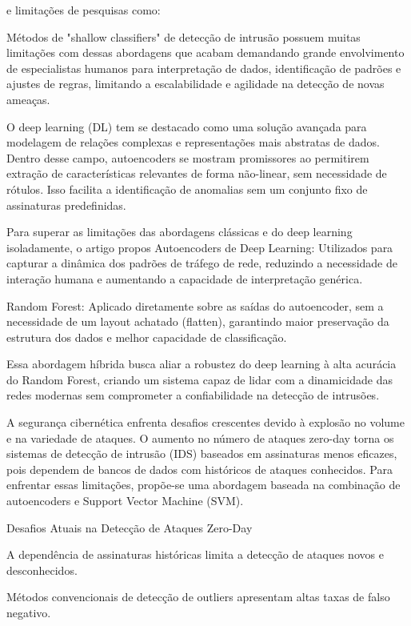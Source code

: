 \documentclass[conference]{IEEEtran}
\begin{document}
    e limitações de pesquisas como: 
            
    Métodos de "shallow classifiers" de detecção de intrusão possuem muitas limitações com dessas abordagens que acabam demandando grande envolvimento de especialistas humanos para interpretação de dados, identificação de padrões e ajustes de regras, limitando a escalabilidade e agilidade na detecção de novas ameaças.
        
    O deep learning (DL) tem se destacado como uma solução avançada para modelagem de relações complexas e representações mais abstratas de dados. Dentro desse campo, autoencoders se mostram promissores ao permitirem extração de características relevantes de forma não-linear, sem necessidade de rótulos. Isso facilita a identificação de anomalias sem um conjunto fixo de assinaturas predefinidas.
        
    Para superar as limitações das abordagens clássicas e do deep learning isoladamente, o artigo propos 
    Autoencoders de Deep Learning: Utilizados para capturar a dinâmica dos padrões de tráfego de rede, reduzindo a necessidade de interação humana e aumentando a capacidade de interpretação genérica.
    
    Random Forest: Aplicado diretamente sobre as saídas do autoencoder, sem a necessidade de um layout achatado (flatten), garantindo maior preservação da estrutura dos dados e melhor capacidade de classificação.
    
    Essa abordagem híbrida busca aliar a robustez do deep learning à alta acurácia do Random Forest, criando um sistema capaz de lidar com a dinamicidade das redes modernas sem comprometer a confiabilidade na detecção de intrusões.

    \cite{4} A segurança cibernética enfrenta desafios crescentes devido à explosão no volume e na variedade de ataques. O aumento no número de ataques zero-day torna os sistemas de detecção de intrusão (IDS) baseados em assinaturas menos eficazes, pois dependem de bancos de dados com históricos de ataques conhecidos. Para enfrentar essas limitações, propõe-se uma abordagem baseada na combinação de autoencoders e Support Vector Machine (SVM).

Desafios Atuais na Detecção de Ataques Zero-Day

A dependência de assinaturas históricas limita a detecção de ataques novos e desconhecidos.

Métodos convencionais de detecção de outliers apresentam altas taxas de falso negativo.
\end{document}
